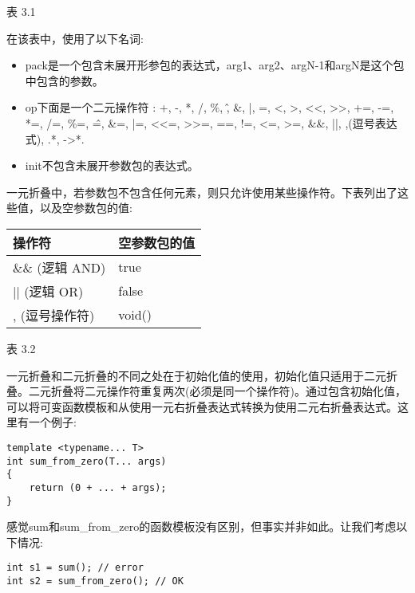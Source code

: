\begin{center}
表 3.1
\end{center}

在该表中，使用了以下名词:

\begin{itemize}
\item
pack是一个包含未展开形参包的表达式，arg1、arg2、argN-1和argN是这个包中包含的参数。

\item
op下面是一个二元操作符 : +, -, *, /, \%, \^, \&, |, =, <, >, <{}<, >{}>, +=, -=, *=, /=, \%=, \^=, \&=, |=, <{}<=, >{}>=, ==, !=, <=, >=, \&\&, ||, ,(逗号表达式), .*, ->*.

\item
init不包含未展开参数包的表达式。
\end{itemize}

一元折叠中，若参数包不包含任何元素，则只允许使用某些操作符。下表列出了这些值，以及空参数包的值:

\begin{table}[H]
\centering
	\begin{tabular}{|l|l|}
		\hline
		\textbf{操作符}  & \textbf{空参数包的值} \\ \hline
		\&\& (逻辑 AND) & true                             \\ \hline
		|| (逻辑 OR)    & false                            \\ \hline
		, (逗号操作符) & void()                           \\ \hline
	\end{tabular}
\end{table}

\begin{center}
表 3.2
\end{center}

一元折叠和二元折叠的不同之处在于初始化值的使用，初始化值只适用于二元折叠。二元折叠将二元操作符重复两次(必须是同一个操作符)。通过包含初始化值，可以将可变函数模板和从使用一元右折叠表达式转换为使用二元右折叠表达式。这里有一个例子:

\begin{lstlisting}[style=styleCXX]
template <typename... T>
int sum_from_zero(T... args)
{
	return (0 + ... + args);
}
\end{lstlisting}

感觉sum和sum\_from\_zero的函数模板没有区别，但事实并非如此。让我们考虑以下情况:

\begin{lstlisting}[style=styleCXX]
int s1 = sum(); // error
int s2 = sum_from_zero(); // OK
\end{lstlisting}

